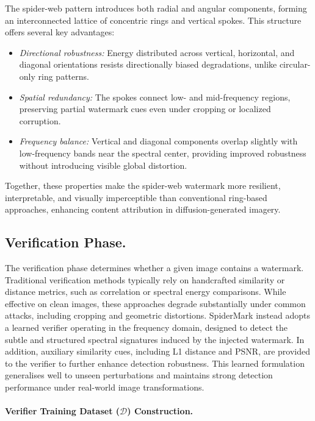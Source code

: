 The spider-web pattern introduces both radial and angular components, forming an interconnected lattice of concentric rings and vertical spokes. This structure offers several key advantages:
\begin{itemize}
    \item \textit{Directional robustness:} Energy distributed across vertical, horizontal, and diagonal orientations resists directionally biased degradations, unlike circular-only ring patterns.
    \item \textit{Spatial redundancy:} The spokes connect low- and mid-frequency regions, preserving partial watermark cues even under cropping or localized corruption.
    \item \textit{Frequency balance:} Vertical and diagonal components overlap slightly with low-frequency bands near the spectral center, providing improved robustness without introducing visible global distortion.
\end{itemize}
Together, these properties make the spider-web watermark more resilient, interpretable, and visually imperceptible than conventional ring-based approaches, enhancing content attribution in diffusion-generated imagery.

\subsection{Verification Phase.}

The verification phase determines whether a given image contains a watermark. Traditional verification methods typically rely on handcrafted similarity or distance metrics, such as correlation or spectral energy comparisons. While effective on clean images, these approaches degrade substantially under common attacks, including cropping and geometric distortions. SpiderMark instead adopts a learned verifier operating in the frequency domain, designed to detect the subtle and structured spectral signatures induced by the injected watermark. In addition, auxiliary similarity cues, including L1 distance and PSNR, are provided to the verifier to further enhance detection robustness. This learned formulation generalises well to unseen perturbations and maintains strong detection performance under real-world image transformations.


\paragraph{Verifier Training Dataset ($\mathcal{D}$) Construction.}


